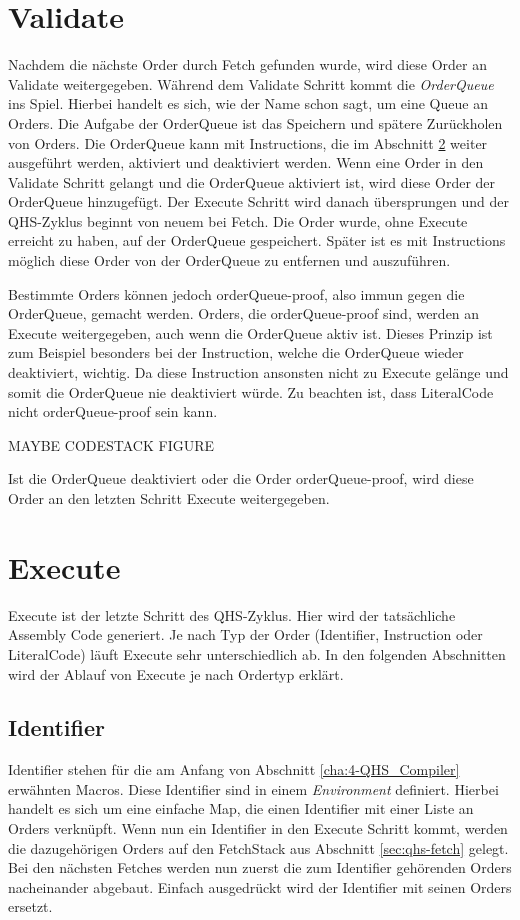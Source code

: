 \section{Validate} \label{sec:qhs-Validate}
Nachdem die nächste Order durch Fetch gefunden wurde, wird diese Order an Validate weitergegeben. Während dem Validate Schritt kommt die \textit{OrderQueue} ins Spiel. Hierbei handelt es sich, wie der Name schon sagt, um eine Queue an Orders.
Die Aufgabe der OrderQueue ist das Speichern und spätere Zurückholen von Orders. Die OrderQueue kann mit Instructions, die im Abschnitt \ref{sec:qhs-execute} weiter ausgeführt werden, aktiviert und deaktiviert werden.
Wenn eine Order in den Validate Schritt gelangt und die OrderQueue aktiviert ist, wird diese Order der OrderQueue hinzugefügt. Der Execute Schritt wird danach übersprungen und der QHS-Zyklus beginnt von neuem bei Fetch.
Die Order wurde, ohne Execute erreicht zu haben, auf der OrderQueue gespeichert. Später ist es mit Instructions möglich diese Order von der OrderQueue zu entfernen und auszuführen.

Bestimmte Orders können jedoch orderQueue-proof, also immun gegen die OrderQueue, gemacht werden. Orders, die orderQueue-proof sind, werden an Execute weitergegeben, auch wenn die OrderQueue aktiv ist.
Dieses Prinzip ist zum Beispiel besonders bei der Instruction, welche die OrderQueue wieder deaktiviert, wichtig. Da diese Instruction ansonsten nicht zu Execute gelänge und somit die OrderQueue nie deaktiviert würde.
Zu beachten ist, dass LiteralCode nicht orderQueue-proof sein kann.

MAYBE CODESTACK FIGURE

Ist die OrderQueue deaktiviert oder die Order orderQueue-proof, wird diese Order an den letzten Schritt Execute weitergegeben.

\section{Execute} \label{sec:qhs-execute}
Execute ist der letzte Schritt des QHS-Zyklus. Hier wird der tatsächliche Assembly Code generiert. Je nach Typ der Order (Identifier, Instruction oder LiteralCode) läuft Execute sehr unterschiedlich ab.
In den folgenden Abschnitten wird der Ablauf von Execute je nach Ordertyp erklärt.

\subsection{Identifier}
Identifier stehen für die am Anfang von Abschnitt \ref{cha:4-QHS_Compiler} erwähnten Macros. Diese Identifier sind in einem \textit{Environment} definiert.
Hierbei handelt es sich um eine einfache Map, die einen Identifier mit einer Liste an Orders verknüpft.
Wenn nun ein Identifier in den Execute Schritt kommt, werden die dazugehörigen Orders auf den FetchStack aus Abschnitt \ref{sec:qhs-fetch} gelegt.
Bei den nächsten Fetches werden nun zuerst die zum Identifier gehörenden Orders nacheinander abgebaut. Einfach ausgedrückt wird der Identifier mit seinen Orders ersetzt.

